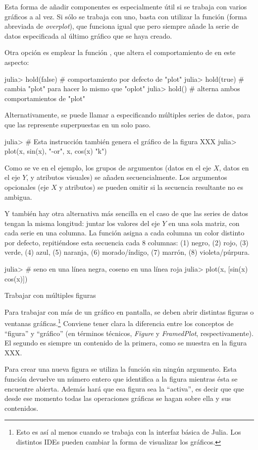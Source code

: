 ﻿\documentclass[spanish]{article}
\begin{document}
Esta forma de añadir componentes es especialmente útil si se trabaja
con varios gráficos a al vez. Si sólo se trabaja con uno, basta con utilizar la
función  (forma abreviada de \emph{overplot}), que funciona igual
que  pero siempre añade la serie de datos especificada al
último gráfico que se haya creado.

Otra opción es emplear la función ,
que altera el comportamiento de  en este aspecto:

julia> hold(false) # comportamiento por defecto de "plot"
julia> hold(true)  # cambia "plot" para hacer lo mismo que "oplot"
julia> hold()      # alterna ambos comportamientos de "plot"

Alternativamente, se puede llamar a  especificando múltiples
series de datos, para que las represente superpuestas en un solo paso.

julia> # Esta instrucción también genera el gráfico de la figura XXX
julia> plot(x, sin(x), "-or", x, cos(x) "k")

Como se ve en el ejemplo, los grupos de argumentos (datos en el eje $X$,
datos en el eje $Y$, y atributos visuales) se añaden secuencialmente. Los
argumentos opcionales (eje $X$ y atributos) se pueden omitir si la
secuencia resultante no es ambigua.

Y también hay otra alternativa más sencilla en el caso de que las series
de datos tengan la misma longitud: juntar los valores del eje $Y$ en una
sola matriz, con cada serie en una columna. La función 
asigna a cada columna un color distinto por defecto, repitiéndose esta
secuencia cada 8 columnas: (1) negro, (2) rojo, (3) verde, (4) azul,
(5) naranja, (6) morado/índigo, (7) marrón, (8) violeta/púrpura.

julia> # seno en una línea negra, coseno en una línea roja
julia> plot(x, [sin(x) cos(x)])


Trabajar con múltiples figuras

Para trabajar con más de un gráfico en pantalla, se deben abrir distintas
figuras o ventanas gráficas.\footnote{%
Esto es así al menos cuando se trabaja con la interfaz básica de Julia.
Los distintos IDEs pueden cambiar la forma de visualizar los gráficos.}%
Conviene tener clara la diferencia entre los conceptos de ``figura'' y
``gráfico'' (en términos técnicos, \emph{Figure} y \emph{FramedPlot},
respectivamente). El segundo es siempre un contenido de la primera,
como se muestra en la figura XXX.

Para crear una nueva figura se utiliza la función  sin ningún
argumento. Esta función devuelve un número entero que identifica a la figura
mientras ésta se encuentre abierta. Además hará que esa figura sea la
``activa'', es decir que que desde ese momento todas las operaciones gráficas
se hagan sobre ella y sus contenidos.
\end{document}
